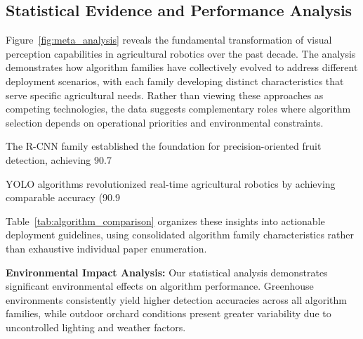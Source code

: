 \documentclass[pdflatex,sn-mathphys-num]{sn-jnl}
\begin{document}
\subsection{Statistical Evidence and Performance Analysis}
Figure~\ref{fig:meta_analysis} reveals the fundamental transformation of visual perception capabilities in agricultural robotics over the past decade. The analysis demonstrates how algorithm families have collectively evolved to address different deployment scenarios, with each family developing distinct characteristics that serve specific agricultural needs. Rather than viewing these approaches as competing technologies, the data suggests complementary roles where algorithm selection depends on operational priorities and environmental constraints.

The R-CNN family established the foundation for precision-oriented fruit detection, achieving 90.7%

YOLO algorithms revolutionized real-time agricultural robotics by achieving comparable accuracy (90.9%

Table~\ref{tab:algorithm_comparison} organizes these insights into actionable deployment guidelines, using consolidated algorithm family characteristics rather than exhaustive individual paper enumeration.

\textbf{Environmental Impact Analysis:} Our statistical analysis demonstrates significant environmental effects on algorithm performance. Greenhouse environments consistently yield higher detection accuracies across all algorithm families, while outdoor orchard conditions present greater variability due to uncontrolled lighting and weather factors.
\end{document}
